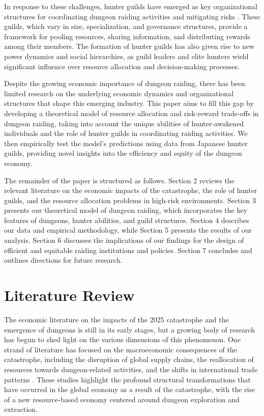 \documentclass[12pt, a4paper]{article}
\begin{document}
In response to these challenges, hunter guilds have emerged as key organizational structures for coordinating dungeon raiding activities and mitigating risks \citep{kim2027emergence}. These guilds, which vary in size, specialization, and governance structures, provide a framework for pooling resources, sharing information, and distributing rewards among their members. The formation of hunter guilds has also given rise to new power dynamics and social hierarchies, as guild leaders and elite hunters wield significant influence over resource allocation and decision-making processes.

Despite the growing economic importance of dungeon raiding, there has been limited research on the underlying economic dynamics and organizational structures that shape this emerging industry. This paper aims to fill this gap by developing a theoretical model of resource allocation and risk-reward trade-offs in dungeon raiding, taking into account the unique abilities of hunter-awakened individuals and the role of hunter guilds in coordinating raiding activities. We then empirically test the model's predictions using data from Japanese hunter guilds, providing novel insights into the efficiency and equity of the dungeon economy.

The remainder of the paper is structured as follows. Section 2 reviews the relevant literature on the economic impacts of the catastrophe, the role of hunter guilds, and the resource allocation problems in high-risk environments. Section 3 presents our theoretical model of dungeon raiding, which incorporates the key features of dungeons, hunter abilities, and guild structures. Section 4 describes our data and empirical methodology, while Section 5 presents the results of our analysis. Section 6 discusses the implications of our findings for the design of efficient and equitable raiding institutions and policies. Section 7 concludes and outlines directions for future research.

\section{Literature Review}
The economic literature on the impacts of the 2025 catastrophe and the emergence of dungeons is still in its early stages, but a growing body of research has begun to shed light on the various dimensions of this phenomenon. One strand of literature has focused on the macroeconomic consequences of the catastrophe, including the disruption of global supply chains, the reallocation of resources towards dungeon-related activities, and the shifts in international trade patterns \citep{kawamoto2026macroeconomic, singh2027global}. These studies highlight the profound structural transformations that have occurred in the global economy as a result of the catastrophe, with the rise of a new resource-based economy centered around dungeon exploration and extraction.
\end{document}
